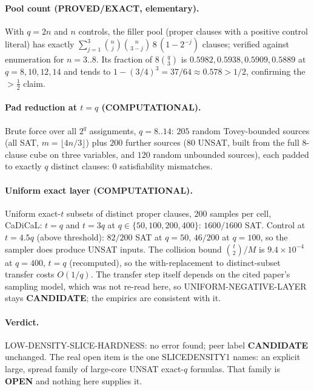 \documentclass[11pt]{article}
\begin{document}
\paragraph{Pool count (PROVED/EXACT, elementary).} With $q=2n$ and $n$ controls, the filler pool (proper clauses with a positive control literal) has exactly
$\sum_{j=1}^{3}\binom nj\binom n{3-j}\,8\,(1-2^{-j})$ clauses; verified against enumeration for $n=3..8$. Its fraction of $8\binom q3$ is $0.5982,0.5938,0.5909,0.5889$ at $q=8,10,12,14$ and tends to $1-(3/4)^3=37/64\approx0.578>1/2$, confirming the $>\tfrac12$ claim.

\paragraph{Pad reduction at $t=q$ (COMPUTATIONAL).} Brute force over all $2^q$ assignments, $q=8..14$:
$205$ random Tovey-bounded sources (all SAT, $m=\lfloor4n/3\rfloor$) plus $200$ further sources ($80$ UNSAT, built from the full 8-clause cube on three variables, and $120$ random unbounded sources), each padded to exactly $q$ distinct clauses: $0$ satisfiability mismatches.

\paragraph{Uniform exact layer (COMPUTATIONAL).} Uniform exact-$t$ subsets of distinct proper clauses, $200$ samples per cell, CaDiCaL:
$t=q$ and $t=3q$ at $q\in\{50,100,200,400\}$: $1600/1600$ SAT. Control at $t=4.5q$ (above threshold): $82/200$ SAT at $q=50$, $46/200$ at $q=100$, so the sampler does produce UNSAT inputs.
The collision bound $\binom t2/M$ is $9.4\times10^{-4}$ at $q=400$, $t=q$ (recomputed), so the with-replacement to distinct-subset transfer costs $O(1/q)$.
The transfer step itself depends on the cited paper's sampling model, which was not re-read here, so UNIFORM-NEGATIVE-LAYER stays \textbf{CANDIDATE}; the empirics are consistent with it.

\paragraph{Verdict.} LOW-DENSITY-SLICE-HARDNESS: no error found; peer label \textbf{CANDIDATE} unchanged. The real open item is the one SLICEDENSITY1 names:
an explicit large, spread family of large-core UNSAT exact-$q$ formulas. That family is \textbf{OPEN} and nothing here supplies it.
\end{document}
